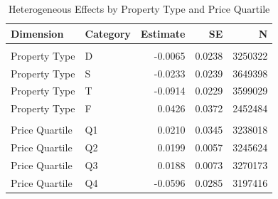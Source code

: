 \begin{table}[!h]
\centering
\caption{\label{tab:tab:heterogeneity}Heterogeneous Effects by Property Type and Price Quartile}
\centering
\begin{tabular}[t]{llrrr}
\toprule
Dimension & Category & Estimate & SE & N\\
\midrule
\addlinespace[0.3em]
\multicolumn{5}{l}{\textbf{Property Type}}\\
\hspace{1em}Property Type & D & -0.0065 & 0.0238 & 3250322\\
\hspace{1em}Property Type & S & -0.0233 & 0.0239 & 3649398\\
\hspace{1em}Property Type & T & -0.0914 & 0.0229 & 3599029\\
\hspace{1em}Property Type & F & 0.0426 & 0.0372 & 2452484\\
\addlinespace[0.3em]
\multicolumn{5}{l}{\textbf{Price Quartile}}\\
\hspace{1em}Price Quartile & Q1 & 0.0210 & 0.0345 & 3238018\\
\hspace{1em}Price Quartile & Q2 & 0.0199 & 0.0057 & 3245624\\
\hspace{1em}Price Quartile & Q3 & 0.0188 & 0.0073 & 3270173\\
\hspace{1em}Price Quartile & Q4 & -0.0596 & 0.0285 & 3197416\\
\bottomrule
\end{tabular}
\end{table}
